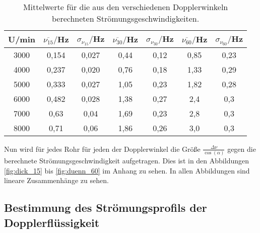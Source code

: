 \begin{table}[htp]
	\begin{center}
    \caption{Mittelwerte für die aus den verschiedenen Dopplerwinkeln berechneten
    Strömungsgeschwindigkeiten.}
    \label{tab:mittelwerte}
		\begin{tabular}{ccccccc}
		\toprule
			{U/min} & {$\overline{\nu_{15}}/$Hz} & {$\sigma_{{\nu_{15}}}/$Hz} &
      {$\overline{\nu_{30}}/$Hz} & {$\sigma_{{\nu_{30}}}/$Hz} &
      {$\overline{\nu_{60}}/$Hz} & {$\sigma_{{\nu_{60}}}/$Hz}\\
			\midrule
			3000 & 0,154 & 0,027 & 0,44 & 0,12 & 0,85 & 0,23\\
			4000 & 0,237 & 0,020 & 0,76 & 0,18 & 1,33 & 0,29\\
			5000 & 0,333 & 0,027 & 1,05 & 0,23 & 1,82 & 0,28\\
			6000 & 0,482 & 0,028 & 1,38 & 0,27 & 2,4 & 0,3\\
			7000 & 0,63  & 0,04 & 1,69 & 0,23 & 2,8 & 0,3\\
			8000 & 0,71  & 0,06 & 1,86 & 0,26 & 3,0 & 0,3\\
		\bottomrule
		\end{tabular}
	\end{center}
\end{table}

Nun wird für jedes Rohr für jeden der Dopplerwinkel die Größe $\frac{\Delta \nu}{\cos(\alpha)}$
gegen die berechnete Strömungsgeschwindigkeit aufgetragen. Dies ist in den Abbildungen
\ref{fig:dick_15} bis \ref{fig:duenn_60} im Anhang zu sehen. In allen Abbildungen sind
lineare Zusammenhänge zu sehen.

\subsection{Bestimmung des Strömungsprofils der Dopplerflüssigkeit}
\label{subsec:strömungsprofil}
